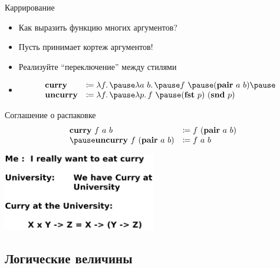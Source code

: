     \begin{frame}{Каррирование}
        \begin{itemize}
            \item[\todo] Как выразить функцию многих аргументов?
            \item[\answer] \pause Пусть принимает кортеж аргументов!
            \item[\todo] Реализуйте ``переключение'' между стилями
            \item[\answer] \pause
            \[
                \begin{array}{l l}
                    \term{curry}   & \termdef \lambda f\ldotp \pause \lambda a~b\ldotp \pause f~ \pause (\term{pair}~a~b) \pause \\
                    \term{uncurry} & \termdef \lambda f\ldotp \pause \lambda p\ldotp f~ \pause (\term{fst}~p)~(\term{snd}~p)
                \end{array}
            \]
        \end{itemize}
        \pause
        \begin{block}{Соглашение о распаковке}
            \[
                \begin{array}{l l}
                    \term{curry}~f~a~b                 & \termdef f~(\term{pair}~a~b) \\ \pause
                    \term{uncurry}~f~(\term{pair}~a~b) & \termdef f~a~b
                \end{array}
            \]
        \end{block}
    \end{frame}

    \begin{frame}{}
        \begin{center}
            \vspace{3em}
            \includegraphics[width=0.5\textwidth]{figs/curry}
        \end{center}
    \end{frame}

    \subsection{Логические величины}

